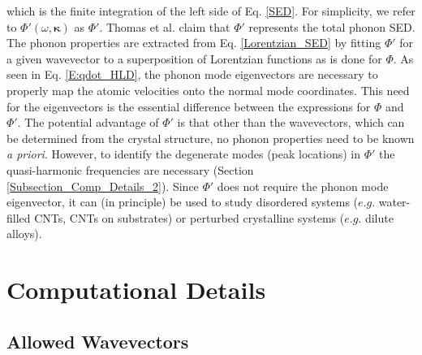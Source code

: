 \documentclass[letterpaper,12pt]{article}
\begin{document}
which is the finite integration of the left side of Eq$.$ \eqref{SED}. For simplicity, we refer to $\Phi'(\omega,\pmb{\kappa})$ as $\Phi'$. Thomas et al. \cite{thomas2010c} claim that $\Phi'$ represents the total phonon SED. The phonon properties are extracted from Eq$.$ \eqref{Lorentzian_SED} by fitting $\Phi'$ for a given wavevector to a superposition of Lorentzian functions as is done for $\Phi$. As seen in Eq$.$ \eqref{E:qdot_HLD}, the phonon mode eigenvectors are necessary to properly map the atomic velocities onto the normal mode coordinates. This need for the eigenvectors is the essential difference between the expressions for $\Phi$ and $\Phi'$. The potential advantage of $\Phi'$ is that other than the wavevectors, which can be determined from the crystal structure, no phonon properties need to be known {\em a priori}. However, to identify the degenerate modes (peak locations) in $\Phi'$ the quasi-harmonic frequencies are necessary (Section \ref{Subsection_Comp_Details_2}).\cite{mcgaughey2006b,turney2009a} Since $\Phi'$ does not require the phonon mode eigenvector, it can (in principle) be used to study disordered systems ($e.g.$ water-filled CNTs\cite{thomas2010c}, CNTs on substrates\cite{shiomi2011b}) or perturbed crystalline systems ($e.g.$ dilute alloys).\cite{shiomi2011a}

\section{\label{Section_Comp}Computational Details}

\subsection{\label{Subsection_Comp_Details_1}Allowed Wavevectors}
\end{document}
